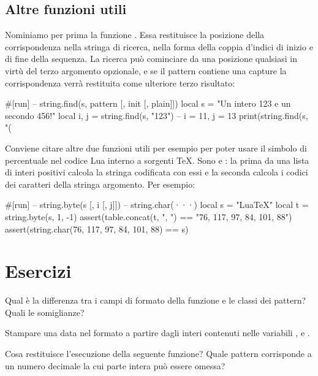 \subsection{Altre funzioni utili}

Nominiamo per prima la funzione . Essa
restituisce la posizione della corrispondenza nella stringa di ricerca, nella
forma della coppia d'indici di inizio e di fine della sequenza. La ricerca può
cominciare da una posizione qualsiasi in virtù del terzo argomento opzionale, e
se il pattern contiene una capture la corrispondenza verrà restituita come
ulteriore terzo risultato:
\begin{lines}
#[run]
-- string.find(s, pattern [, init [, plain]])
local s = "Un intero 123 e un secondo 456!"
local i, j = string.find(s, "123") -- i = 11, j = 13
print(string.find(s, "(%
\end{lines}

Conviene citare altre due funzioni utili per esempio per poter usare il simbolo
di percentuale nel codice Lua interno a sorgenti \TeX{}. Sono
 e : la
prima da una lista di interi positivi calcola la stringa codificata con essi e
la seconda calcola i codici dei caratteri della stringa argomento. Per esempio:
\begin{lines}
#[run]
-- string.byte(s [, i [, j]])
-- string.char(···)
local s = "LuaTeX"
local t = {string.byte(s, 1, -1)}
assert(table.concat(t, ", ") == "76, 117, 97, 84, 101, 88")
assert(string.char(76, 117, 97, 84, 101, 88) == s)
\end{lines}


\section{Esercizi}

\begin{Exercise}[label=libstd-01]
Qual è la differenza tra i campi di formato della funzione  e
le classi dei pattern? Quali le somiglianze?
\end{Exercise}

\begin{Exercise}[label=libstd-02]
Stampare una data nel formato  a partire dagli interi contenuti
nelle variabili ,  e .
\end{Exercise}

\begin{Exercise}[label=libstd-03]
Cosa restituisce l'esecuzione della seguente funzione?
Quale pattern corrisponde a un numero decimale la cui parte intera può essere
omessa?
\end{Exercise}

